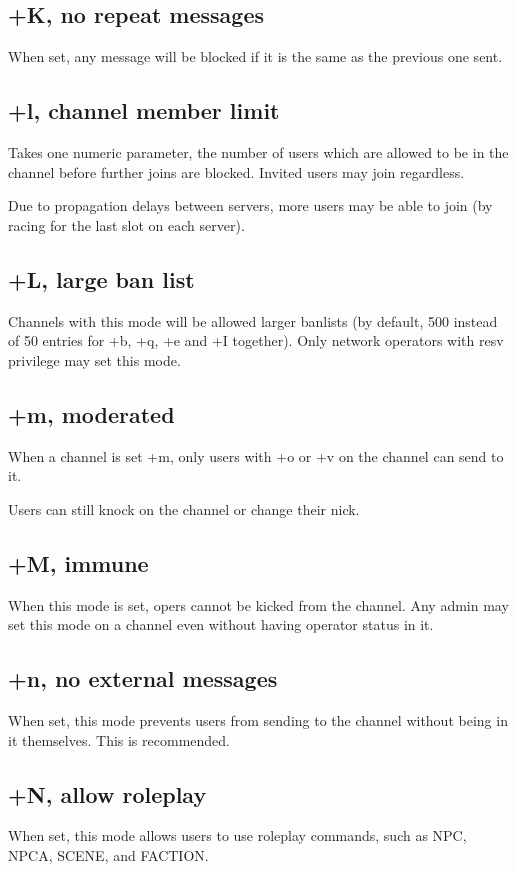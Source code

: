 \subsection{+K, no repeat messages}
	When set, any  message will be blocked if it is the same as the
	previous one sent.


\subsection{+l, channel member limit}
	Takes one numeric parameter, the number of users which are allowed to
	be in the channel before further joins are blocked. Invited users may
	join regardless.

	Due to propagation delays between servers, more users may be able to
	join (by racing for the last slot on each server).

\subsection{+L, large ban list}
	Channels with this mode will be allowed larger banlists (by default,
	500 instead of 50 entries for +b, +q, +e and +I together). Only network
	operators with resv privilege may set this mode.

\subsection{+m, moderated}
	When a channel is set +m, only users with +o or +v on the channel can
	send to it.

	Users can still knock on the channel or change their nick.

\subsection{+M, immune}
	When this mode is set, opers cannot be kicked from the channel.
	Any admin may set this mode on a channel even without having operator
	status in it.

\subsection{+n, no external messages}
	When set, this mode prevents users from sending to the channel without
	being in it themselves. This is recommended.

\subsection{+N, allow roleplay}
	When set, this mode allows users to use roleplay commands, such as NPC,
	NPCA, SCENE, and FACTION.

